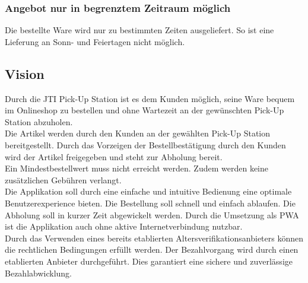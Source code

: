 \subsubsection{Angebot  nur in begrenztem Zeitraum möglich}
Die bestellte Ware wird nur zu bestimmten Zeiten ausgeliefert. So ist eine Lieferung an Sonn- und Feiertagen nicht möglich. 

\subsection{Vision}
Durch die JTI Pick-Up Station ist es dem Kunden möglich, seine Ware bequem im Onlineshop zu bestellen und ohne Wartezeit an der gewünschten Pick-Up Station abzuholen. \\
Die Artikel werden durch den Kunden an der gewählten Pick-Up Station bereitgestellt. Durch das Vorzeigen der Bestellbestätigung durch den Kunden wird der Artikel freigegeben und steht zur Abholung bereit.\\ 
Ein Mindestbestellwert muss nicht erreicht werden. Zudem werden keine zusätzlichen Gebühren verlangt. \\
Die Applikation soll durch eine einfache und intuitive Bedienung eine optimale Benutzerexperience bieten. Die Bestellung soll schnell und einfach ablaufen. Die Abholung soll in kurzer Zeit abgewickelt werden. Durch die Umsetzung als \gls{PWA} ist die Applikation auch ohne aktive Internetverbindung nutzbar. \\
Durch das Verwenden eines bereits etablierten Altersverifikationsanbieters können die rechtlichen Bedingungen erfüllt werden. Der Bezahlvorgang wird durch einen etablierten Anbieter durchgeführt. Dies garantiert eine sichere und zuverlässige Bezahlabwicklung. 

\newpage